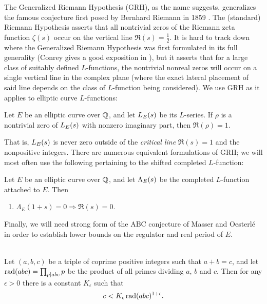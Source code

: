 The Generalized Riemann Hypothesis (GRH), as the name suggests, generalizes the famous conjecture first posed by Bernhard Riemann in 1859 \cite{Rie-1859}. The (standard) Riemann Hypothesis asserts that all nontrivial zeros of the Riemann zeta function $\zeta(s)$ occur on the vertical line $\Re(s)=\frac{1}{2}$. It is hard to track down where the Generalized Riemann Hypothesis was first formulated in its full generality (Conrey gives a good exposition in \cite{Con-2003}), but it asserts that for a large class of suitably defined $L$-functions, the nontrivial nonreal zeros will occur on a single vertical line in the complex plane (where the exact lateral placement of said line depends on the class of $L$-function being considered). We use GRH as it applies to elliptic curve $L$-functions:
\begin{conjecture} \cite{Rie-1859} \cite{Con-2003}
\label{conj:GRH1}
\mbox{}
Let $E$ be an elliptic curve over $\mathbb{Q}$, and let $L_E(s)$ be its $L$-series. If $\rho$ is a nontrivial zero of $L_E(s)$ with nonzero imaginary part, then $\Re(\rho) = 1$.
\end{conjecture}
That is, $L_E(s)$ is never zero outside of the {\it critical line} $\Re(s)=1$ and the nonpositive integers. There are numerous equivalent formulations of GRH; we will most often use the following pertaining to the shifted completed $L$-function:
\begin{conjecture} \cite{Rie-1859} \cite{Con-2003}
\label{conj:GRH2}
 \mbox{}
 Let $E$ be an elliptic curve over $\mathbb{Q}$, and let $\Lambda_E(s)$ be the completed $L$-function attached to $E$. Then
\begin{enumerate}
\item $\Lambda_E(1+s) = 0 \Longrightarrow \Re(s) = 0$.
\end{enumerate}
\end{conjecture}

Finally, we will need strong form of the ABC conjecture of Masser and Oesterl\'{e} in order to establish lower bounds on the regulator and real period of $E$.
\begin{conjecture} \cite{Mas-1985} \cite{Oes-1988}
\label{conj:ABC} \\
Let $(a,b,c)$ be a triple of coprime positive integers such that $a+b = c$, and let $\operatorname{rad}(abc) = \prod_{p | abc} p$ be the product of all primes dividing $a$, $b$ and $c$. Then for any $\epsilon > 0$ there is a constant $K_{\epsilon}$ such that
\begin{equation}
c < K_{\epsilon}\operatorname{rad}(abc)^{1+\epsilon}.
\end{equation}
\end{conjecture}

